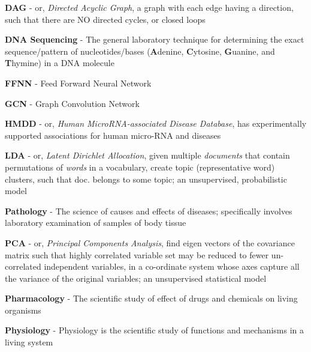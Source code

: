 \begin{mybox}
    \textbf{DAG} - or, \textit{Directed Acyclic Graph}, a graph with each edge
        having a direction, such that there are NO directed cycles, or closed
        loops
\end{mybox}

\begin{mybox}
    \textbf{DNA Sequencing} - The general laboratory technique for determining
        the exact sequence/pattern of nucleotides/bases (\textbf{A}denine,
        \textbf{C}ytosine, \textbf{G}uanine, and \textbf{T}hymine) in a DNA molecule
\end{mybox}

\begin{mybox}
    \textbf{FFNN} - Feed Forward Neural Network
\end{mybox}

\begin{mybox}
    \textbf{GCN} - Graph Convolution Network \cite{kipfGCN}
\end{mybox}

\begin{mybox}
    \textbf{HMDD} - or, \textit{Human MicroRNA-associated Disease Database}, has
        experimentally supported associations for human micro-RNA and diseases
\end{mybox}

\begin{mybox}
    \textbf{LDA} - or, \textit{Latent Dirichlet Allocation}, given multiple
        \textit{documents} that contain permutations of \textit{words} in a
        vocabulary, create topic (representative word) clusters, such that doc.
        belongs to some topic; an unsupervised, probabilistic model
\end{mybox}

\begin{mybox}
    \textbf{Pathology} - The science of causes and effects of diseases; specifically
        involves laboratory examination of samples of body tissue
\end{mybox}

\begin{mybox}
    \textbf{PCA} - or, \textit{Principal Components Analysis}, find eigen vectors
        of the covariance matrix such that highly correlated variable set may be
        reduced to fewer un-correlated independent variables, in a co-ordinate
        system whose axes capture all the variance of the original variables;
        an unsupervised statistical model
\end{mybox}

\begin{mybox}
    \textbf{Pharmacology} - The scientific study of effect of drugs and chemicals
        on living organisms
\end{mybox}

\begin{mybox}
    \textbf{Physiology} - Physiology is the scientific study of functions and
        mechanisms in a living system
\end{mybox}

